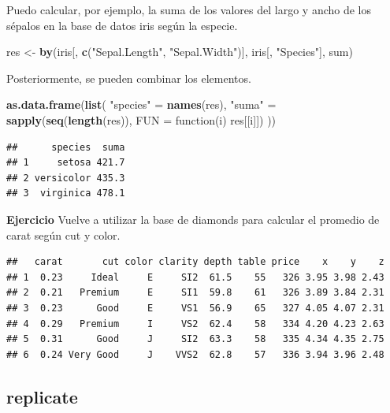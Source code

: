 \documentclass[]{article}
\newenvironment{Shaded}{\begin{snugshade}}{\end{snugshade}}
\newcommand{\KeywordTok}[1]{\textcolor[rgb]{0.13,0.29,0.53}{\textbf{{#1}}}}
\newcommand{\DataTypeTok}[1]{\textcolor[rgb]{0.13,0.29,0.53}{{#1}}}
\newcommand{\StringTok}[1]{\textcolor[rgb]{0.31,0.60,0.02}{{#1}}}
\newcommand{\NormalTok}[1]{{#1}}
\begin{document}
Puedo calcular, por ejemplo, la suma de los valores del largo y ancho de
los sépalos en la base de datos iris según la especie.

\begin{Shaded}
\begin{Highlighting}[]
\NormalTok{res <-}\StringTok{ }\KeywordTok{by}\NormalTok{(iris[, }\KeywordTok{c}\NormalTok{(}\StringTok{"Sepal.Length"}\NormalTok{, }\StringTok{"Sepal.Width"}\NormalTok{)], iris[, }\StringTok{"Species"}\NormalTok{], sum)}
\end{Highlighting}
\end{Shaded}

Posteriormente, se pueden combinar los elementos.

\begin{Shaded}
\begin{Highlighting}[]
\KeywordTok{as.data.frame}\NormalTok{(}\KeywordTok{list}\NormalTok{(}
  \StringTok{"species"} \NormalTok{=}\StringTok{ }\KeywordTok{names}\NormalTok{(res), }
  \StringTok{"suma"} \NormalTok{=}\StringTok{ }\KeywordTok{sapply}\NormalTok{(}\KeywordTok{seq}\NormalTok{(}\KeywordTok{length}\NormalTok{(res)), }\DataTypeTok{FUN =} \NormalTok{function(i) res[[i]])}
  \NormalTok{))}
\end{Highlighting}
\end{Shaded}

\begin{verbatim}
##      species  suma
## 1     setosa 421.7
## 2 versicolor 435.3
## 3  virginica 478.1
\end{verbatim}

\textbf{Ejercicio} Vuelve a utilizar la base de diamonds para calcular
el promedio de carat según cut y color.

\begin{verbatim}
##   carat       cut color clarity depth table price    x    y    z
## 1  0.23     Ideal     E     SI2  61.5    55   326 3.95 3.98 2.43
## 2  0.21   Premium     E     SI1  59.8    61   326 3.89 3.84 2.31
## 3  0.23      Good     E     VS1  56.9    65   327 4.05 4.07 2.31
## 4  0.29   Premium     I     VS2  62.4    58   334 4.20 4.23 2.63
## 5  0.31      Good     J     SI2  63.3    58   335 4.34 4.35 2.75
## 6  0.24 Very Good     J    VVS2  62.8    57   336 3.94 3.96 2.48
\end{verbatim}

\subsection{replicate}\label{replicate}
\end{document}
